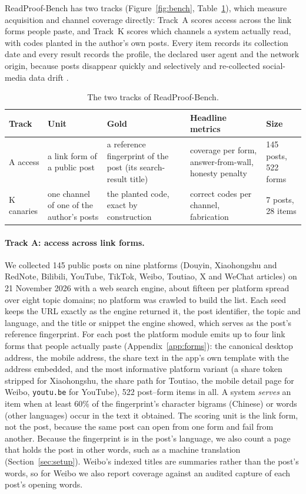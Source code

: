 ReadProof-Bench has two tracks (Figure~\ref{fig:bench}, Table~\ref{tab:tracks}), which measure acquisition and
channel coverage directly: Track~A scores access across the link forms people paste, and Track~K scores which
channels a system actually read, with codes planted in the author's own posts. Every item records its collection
date and every result records the profile, the declared user agent and the network origin, because posts
disappear quickly and selectively \citep{pew2024disappears,zhu2013velocity} and re-collected social-media data
drift \citep{elmas2023persistence}.

\begin{table}[t]
\centering\small
\caption{The two tracks of ReadProof-Bench.}
\label{tab:tracks}
\begin{tabular}{@{}l p{2.7cm} p{4.0cm} p{3.0cm} p{1.9cm}@{}}
\toprule
Track & Unit & Gold & Headline metrics & Size \\
\midrule
A access & a link form of a public post & a reference fingerprint of the post (its search-result title) & coverage per
  form, answer-from-wall, honesty penalty & 145 posts, 522 forms \\
K canaries & one channel of one of the author's posts & the planted code, exact by construction & correct codes
  per channel, fabrication & 7 posts, 28 items \\
\bottomrule
\end{tabular}
\end{table}

\paragraph{Track A: access across link forms.}
We collected 145 public posts on nine platforms (Douyin, Xiaohongshu and RedNote, Bilibili, YouTube, TikTok,
Weibo, Toutiao, X and WeChat articles) on 21 November 2026 with a web search engine, about fifteen per platform
spread over eight topic domains; no platform was crawled to build the list. Each seed keeps the URL exactly as
the engine returned it, the post identifier, the topic and language, and the title or snippet the engine showed,
which serves as the post's reference fingerprint. For each post the platform module emits up to four link forms
that people actually paste (Appendix~\ref{app:forms}): the canonical desktop address, the mobile address, the
share text in the app's own template with the address embedded, and the most informative platform variant (a share token stripped
for Xiaohongshu, the share path for Toutiao, the mobile detail page for Weibo, \texttt{youtu.be} for YouTube),
522 post--form items in all. A system \emph{serves} an item when at least 60\% of the fingerprint's character
bigrams (Chinese) or words (other languages) occur in the text it obtained. The scoring unit is the link form,
not the post, because the same post can open from one form and fail from another. Because the fingerprint is in the
post's language, we also count a page that holds the post in other words, such as a machine translation
(Section~\ref{sec:setup}). Weibo's indexed titles are
summaries rather than the post's words, so for Weibo we also report coverage against an audited capture of each
post's opening words.

